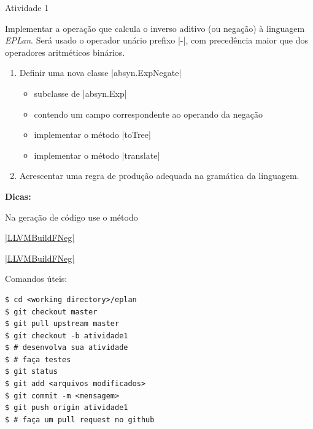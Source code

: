 \documentclass[smaller]{beamer}
\newenvironment{tips}{%
  \textbf{Dicas:}\newline
  \begin{list}{*}{%
      \setlength{\topsep}{0pt}%
      \setlength{\itemsep}{0pt}%
      \setlength{\parsep}{0pt}%
    }%
  }{%
  \end{list}%
}
\newcommand{\lang}{\textsl{EPLan}}
\begin{document}
\begin{frame}{Atividade 1}
  \begin{tcolorbox}[title=Inverso aditivo]
    Implementar a operação que calcula o inverso aditivo (ou negação)
    à linguagem \lang{}. Será usado o operador unário prefixo
    \pyginline|-|, com precedência maior que dos operadores
    aritméticos binários.
    \begin{enumerate}
      \item Definir uma nova classe \pyginline|absyn.ExpNegate|
      \begin{itemize}
        \item subclasse de \pyginline|absyn.Exp|
        \item contendo um campo correspondente ao operando da negação
        \item implementar o método \pyginline|toTree|
        \item implementar o método \pyginline|translate|
      \end{itemize}
      \item Acrescentar uma regra de produção adequada na gramática da
      linguagem.
    \end{enumerate}

    \begin{tips}
      \item Na geração de código use o método

      \href{http://bytedeco.org/javacpp-presets/llvm/apidocs/org/bytedeco/javacpp/LLVM.html#LLVMBuildFNeg-org.bytedeco.javacpp.LLVM.LLVMBuilderRef-org.bytedeco.javacpp.LLVM.LLVMValueRef-java.lang.String-}{\pyginline|LLVMBuildFNeg|}

      \href{http://llvm.org/docs/doxygen/html/group__LLVMCCoreInstructionBuilder.html#gaf748025627b03f4f2659b006b127b758}{\pyginline|LLVMBuildFNeg|}
    \end{tips}
\end{tcolorbox}

  \framebreak
  
  Comandos úteis:
\begin{Verbatim}[frame=single]
$ cd <working directory>/eplan
$ git checkout master
$ git pull upstream master
$ git checkout -b atividade1
$ # desenvolva sua atividade
$ # faça testes
$ git status
$ git add <arquivos modificados>
$ git commit -m <mensagem>
$ git push origin atividade1
$ # faça um pull request no github
\end{Verbatim}
\end{frame}
\end{document}
